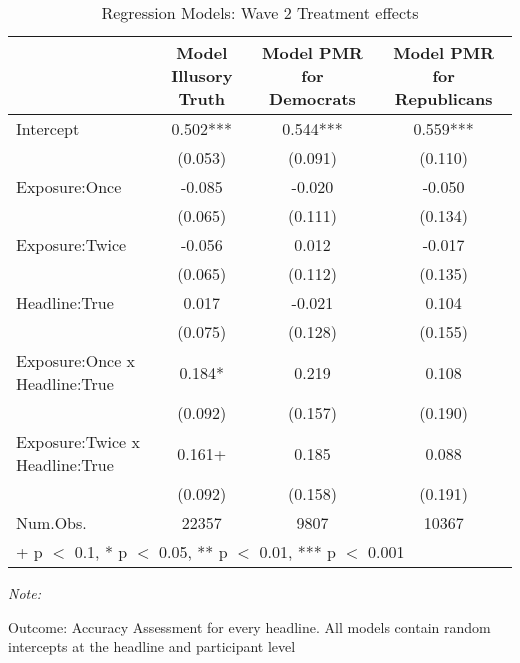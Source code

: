 \begin{table}

\caption{Regression Models: Wave 2 Treatment effects}
\centering
\begin{threeparttable}
\begin{tabular}[t]{lccc}
\toprule
  & Model Illusory Truth & Model PMR for Democrats & Model PMR for Republicans\\
\midrule
Intercept & 0.502*** & 0.544*** & 0.559***\\
 & (0.053) & (0.091) & (0.110)\\
Exposure:Once & -0.085 & -0.020 & -0.050\\
 & (0.065) & (0.111) & (0.134)\\
Exposure:Twice & -0.056 & 0.012 & -0.017\\
 & (0.065) & (0.112) & (0.135)\\
Headline:True & 0.017 & -0.021 & 0.104\\
 & (0.075) & (0.128) & (0.155)\\
Exposure:Once x Headline:True & 0.184* & 0.219 & 0.108\\
 & (0.092) & (0.157) & (0.190)\\
Exposure:Twice x Headline:True & 0.161+ & 0.185 & 0.088\\
 & (0.092) & (0.158) & (0.191)\\
\midrule
Num.Obs. & 22357 & 9807 & 10367\\
\bottomrule
\multicolumn{4}{l}{\rule{0pt}{1em}+ p $<$ 0.1, * p $<$ 0.05, ** p $<$ 0.01, *** p $<$ 0.001}\\
\end{tabular}
\begin{tablenotes}
\item \textit{Note: } 
\item Outcome: Accuracy Assessment for every headline. All models contain random intercepts at the headline and participant level
\end{tablenotes}
\end{threeparttable}
\end{table}
